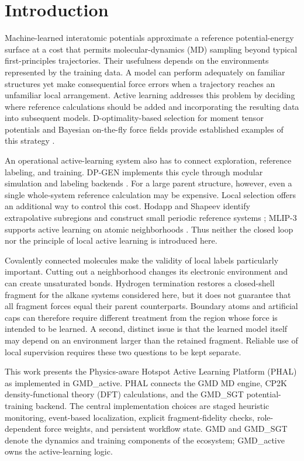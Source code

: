 \section{Introduction}
Machine-learned interatomic potentials approximate a reference potential-energy
surface at a cost that permits molecular-dynamics (MD) sampling beyond typical
first-principles trajectories. Their usefulness depends on the environments
represented by the training data. A model can perform adequately on familiar
structures yet make consequential force errors when a trajectory reaches
an unfamiliar local arrangement. Active learning addresses this problem
by deciding where reference calculations should be added and incorporating
the resulting data into subsequent models. D-optimality-based selection
for moment tensor potentials and Bayesian on-the-fly force fields provide
established examples of this strategy
\citep{podryabinkin2017active,vandermause2020flare}.

An operational active-learning system also has to connect exploration,
reference labeling, and training. DP-GEN implements this cycle through
modular simulation and labeling backends \citep{zhang2020dpgen}.
For a large parent structure, however, even a single whole-system reference
calculation may be expensive. Local selection offers an additional way to
control this cost. Hodapp and Shapeev identify extrapolative subregions and
construct small periodic reference systems \citep{hodapp2020inoperando};
MLIP-3 supports active learning on atomic neighborhoods
\citep{podryabinkin2023mlip3}. Thus neither the closed loop nor the principle
of local active learning is introduced here.

Covalently connected molecules make the validity of local labels particularly
important. Cutting out a neighborhood changes its electronic environment and
can create unsaturated bonds. Hydrogen termination restores a closed-shell
fragment for the alkane systems considered here, but it does not guarantee
that all fragment forces equal their parent counterparts. Boundary atoms and
artificial caps can therefore require different treatment from the region
whose force is intended to be learned. A second, distinct issue is that the
learned model itself may depend on an environment larger than the retained
fragment. Reliable use of local supervision requires these two questions to
be kept separate.

This work presents the Physics-aware Hotspot Active Learning Platform
(PHAL) as implemented in GMD\_active. PHAL connects the GMD MD engine,
CP2K density-functional theory (DFT) calculations, and the GMD\_SGT
potential-training backend. The central implementation choices are staged
heuristic monitoring, event-based localization, explicit fragment-fidelity
checks, role-dependent force weights, and persistent workflow state.
GMD and GMD\_SGT denote the dynamics and training components of the
ecosystem; GMD\_active owns the active-learning logic.

